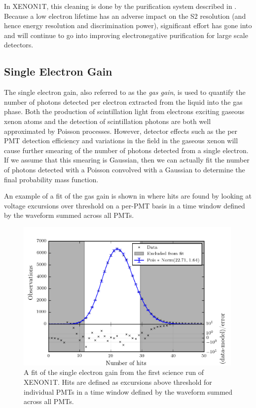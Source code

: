 In XENON1T, this cleaning is done by the purification system described in .  Because a low electron lifetime has an adverse impact on the S2 resolution (and hence energy resolution and discrimination power), significant effort has gone into and will continue to go into improving electronegative purification for large scale detectors.  


\subsection{Single Electron Gain}
\label{sec:xe1t_gas_gain}

The single electron gain, also referred to as the \textit{gas gain}, is used to quantify the number of photons detected per electron extracted from the liquid into the gas phase.  Both the production of scintillation light from electrons exciting gaseous xenon atoms and the detection of scintillation photons are both well approximated by Poisson processes.  However, detector effects such as the per PMT detection efficiency and variations in the field in the gaseous xenon will cause further smearing of the number of photons detected from a single electron.  If we assume that this smearing is Gaussian, then we can actually fit the number of photons detected with a Poisson convolved with a Gaussian to determine the final probability mass function.  

An example of a fit of the gas gain is shown in  where hits are found by looking at voltage excursions over threshold on a per-PMT basis in a time window defined by the waveform summed across all PMTs.

\begin{figure}[t]
	\centering
	\includegraphics[width=0.99\textwidth]{xe1t_single_electron_gain}
	\caption{A fit of the single electron gain from the first science run of XENON1T.  Hits are defined as excursions above threshold for individual PMTs in a time window defined by the waveform summed across all PMTs.}
	\label{fig:xe1t_single_electron_gain}
\end{figure}


